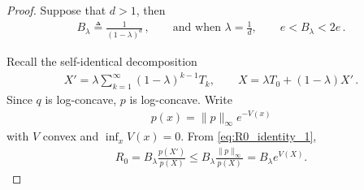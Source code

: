 \begin{proof}
    Suppose that $d>1$, then
    \begin{align}
        B_\lambda\triangleq\frac{1}{(1-\lambda)^d}\,,
        \qquad
        \text{and when }\lambda=\frac{1}{d}, \qquad e < B_\lambda < 2e\,.
    \end{align}

    Recall the self-identical decomposition
    \begin{align}
        X'=\lambda\sum_{k=1}^\infty (1-\lambda)^{k-1}T_k,
        \qquad
        X=\lambda T_0+(1-\lambda)X'\,.
    \end{align}
    Since $q$ is log-concave, $p$ is log-concave.
    Write
    \begin{align}
        p(x)=\|p\|_\infty e^{-V(x)}
    \end{align}
    with $V$ convex and $\inf_x V(x)=0$. From \eqref{eq:R0_identity_1},
    \begin{align}
        R_0
        =
        B_\lambda
        \frac{p(X')}{p(X)}
        \le
        B_\lambda
        \frac{\|p\|_\infty}{p(X)}
        =
        B_\lambda e^{V(X)}.
        \label{eq:log_concave_d_factorial_R0_upper}
    \end{align}


\end{proof}

